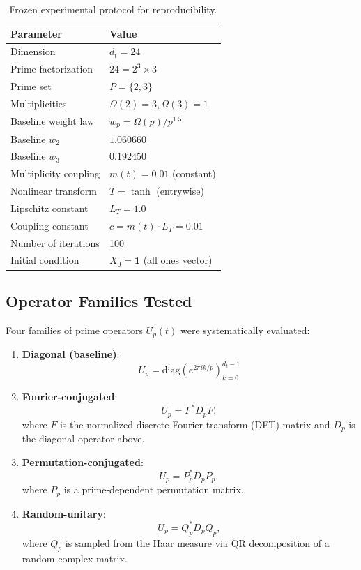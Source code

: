 \documentclass[11pt,a4paper]{article}
\begin{document}
\begin{table}[h]
\centering
\begin{tabular}{ll}
\toprule
\textbf{Parameter} & \textbf{Value} \\
\midrule
Dimension & \(d_t = 24\) \\
Prime factorization & \(24 = 2^3 \times 3\) \\
Prime set & \(P = \{2, 3\}\) \\
Multiplicities & \(\Omega(2) = 3, \Omega(3) = 1\) \\
Baseline weight law & \(w_p = \Omega(p) / p^{1.5}\) \\
Baseline \(w_2\) & \(1.060660\) \\
Baseline \(w_3\) & \(0.192450\) \\
Multiplicity coupling & \(m(t) = 0.01\) (constant) \\
Nonlinear transform & \(T = \tanh\) (entrywise) \\
Lipschitz constant & \(L_T = 1.0\) \\
Coupling constant & \(c = m(t) \cdot L_T = 0.01\) \\
Number of iterations & 100 \\
Initial condition & \(X_0 = \mathbf{1}\) (all ones vector) \\
\bottomrule
\end{tabular}
\caption{Frozen experimental protocol for reproducibility.}
\label{tab:protocol}
\end{table}

\subsection{Operator Families Tested}

Four families of prime operators \(U_p(t)\) were systematically evaluated:

\begin{enumerate}
\item \textbf{Diagonal (baseline)}: 
\[
U_p = \mathrm{diag}(e^{2\pi i k / p})_{k=0}^{d_t-1}
\]

\item \textbf{Fourier-conjugated}:
\[
U_p = F^* D_p F,
\]
where \(F\) is the normalized discrete Fourier transform (DFT) matrix and \(D_p\) is the diagonal operator above.

\item \textbf{Permutation-conjugated}:
\[
U_p = P_p^* D_p P_p,
\]
where \(P_p\) is a prime-dependent permutation matrix.

\item \textbf{Random-unitary}:
\[
U_p = Q_p^* D_p Q_p,
\]
where \(Q_p\) is sampled from the Haar measure via QR decomposition of a random complex matrix.
\end{enumerate}
\end{document}
